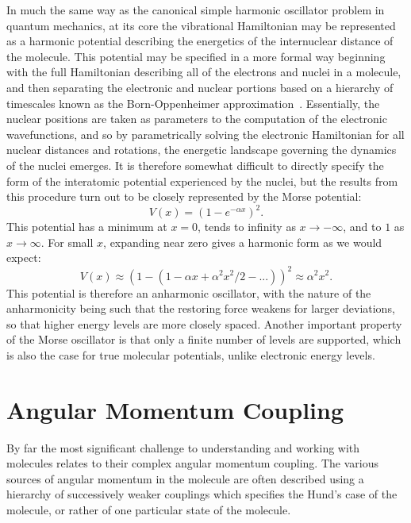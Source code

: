In much the same way as the canonical simple harmonic oscillator problem in quantum mechanics, at its core the vibrational Hamiltonian may be represented as a harmonic potential describing the energetics of the internuclear distance of the molecule.
This potential may be specified in a more formal way beginning with the full Hamiltonian describing all of the electrons and nuclei in a molecule, and then separating the electronic and nuclear portions based on a hierarchy of timescales known as the Born-Oppenheimer approximation~\citep[Sec.~8.1]{Atkins2005}.
Essentially, the nuclear positions are taken as parameters to the computation of the electronic wavefunctions, and so by parametrically solving the electronic Hamiltonian for all nuclear distances and rotations, the energetic landscape governing the dynamics of the nuclei emerges.
It is therefore somewhat difficult to directly specify the form of the interatomic potential experienced by the nuclei, but the results from this procedure turn out to be closely represented by the Morse potential:
\begin{equation}
V(x) = \left(1-e^{-\alpha x}\right)^2.
\end{equation}
This potential has a minimum at $x=0$, tends to infinity as $x\rightarrow-\infty$, and to $1$ as $x\rightarrow\infty$. For small $x$, expanding near zero gives a harmonic form as we would expect:
\begin{equation}
V(x) \approx \left(1-(1-\alpha x + \alpha^2 x^2 / 2 - ...)\right)^2 \approx \alpha^2 x^2.
\end{equation}
This potential is therefore an anharmonic oscillator, with the nature of the anharmonicity being such that the restoring force weakens for larger deviations, so that higher energy levels are more closely spaced.
Another important property of the Morse oscillator is that only a finite number of levels are supported, which is also the case for true molecular potentials, unlike electronic energy levels.


\section{Angular Momentum Coupling}

By far the most significant challenge to understanding and working with molecules relates to their complex angular momentum coupling. 
The various sources of angular momentum in the molecule are often described using a hierarchy of successively weaker couplings which specifies the Hund's case of the molecule, or rather of one particular state of the molecule.

